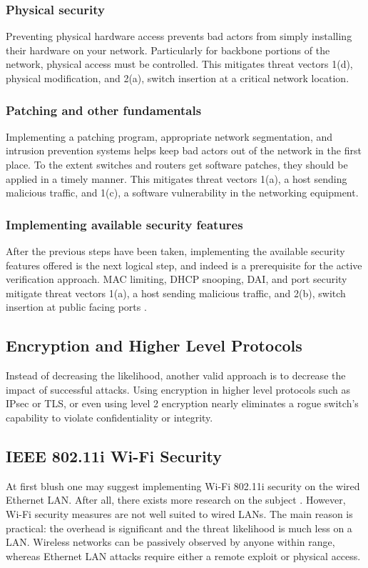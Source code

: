 \documentclass[journal]{IEEEtran}
\begin{document}
\subsubsection{Physical security}
Preventing physical hardware access prevents bad actors from simply installing their hardware on
your network. Particularly for backbone portions of the network, physical access must be controlled.
This mitigates threat vectors 1(d), physical modification, and 2(a), switch insertion at a
critical network location.

\subsubsection{Patching and other fundamentals}
Implementing a patching program, appropriate network segmentation, and intrusion prevention systems
helps keep bad actors out of the network in the first place. To the extent switches and routers get
software patches, they should be applied in a timely manner. This mitigates threat vectors 1(a), a
host sending malicious traffic, and 1(c), a software vulnerability in the networking equipment.

\subsubsection{Implementing available security features}
After the previous steps have been taken, implementing the available security
features offered is the next logical step, and indeed is a prerequisite for the active verification
approach. MAC limiting, DHCP snooping, DAI, and port security mitigate threat vectors 1(a), a host
sending malicious traffic, and 2(b), switch insertion at public facing ports \cite{b1}.


\subsection{Encryption and Higher Level Protocols}
Instead of decreasing the likelihood, another valid approach is to decrease the impact of
successful attacks. Using encryption in higher level protocols such as IPsec or TLS, or even using
level 2 encryption \cite{b3} nearly eliminates a rogue switch's capability to violate
confidentiality or integrity.


\subsection{IEEE 802.11i Wi-Fi Security}
At first blush one may suggest implementing Wi-Fi 802.11i security on the wired Ethernet LAN. After
all, there exists more research on the subject \cite{b4}\cite{b5}. However, Wi-Fi security measures
are not well suited to wired LANs. The main reason is practical: the overhead is significant and
the threat likelihood is much less on a LAN. Wireless networks can be passively observed by anyone
within range, whereas Ethernet LAN attacks require either a remote exploit or physical access.
\end{document}
